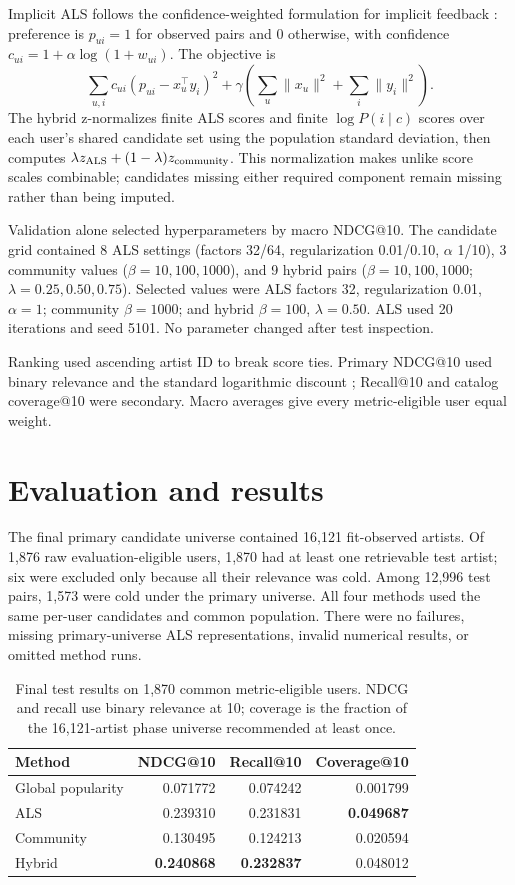 \documentclass[10pt,a4paper]{article}
\begin{document}
Implicit ALS follows the confidence-weighted formulation for implicit feedback \cite{hu2008}: preference is $p_{ui}=1$ for observed pairs and 0 otherwise, with confidence $c_{ui}=1+\alpha\log(1+w_{ui})$. The objective is
\[
 \sum_{u,i}c_{ui}(p_{ui}-x_u^\top y_i)^2+\gamma\left(\sum_u\lVert x_u\rVert^2+\sum_i\lVert y_i\rVert^2\right).
\]
The hybrid z-normalizes finite ALS scores and finite $\log P(i\mid c)$ scores over each user's shared candidate set using the population standard deviation, then computes $\lambda z_{\rm ALS}+(1-\lambda)z_{\rm community}$. This normalization makes unlike score scales combinable; candidates missing either required component remain missing rather than being imputed.

Validation alone selected hyperparameters by macro NDCG@10. The candidate grid contained 8 ALS settings (factors 32/64, regularization 0.01/0.10, $\alpha$ 1/10), 3 community values ($\beta=10,100,1000$), and 9 hybrid pairs ($\beta=10,100,1000$; $\lambda=0.25,0.50,0.75$). Selected values were ALS factors 32, regularization 0.01, $\alpha=1$; community $\beta=1000$; and hybrid $\beta=100$, $\lambda=0.50$. ALS used 20 iterations and seed 5101. No parameter changed after test inspection.

Ranking used ascending artist ID to break score ties. Primary NDCG@10 used binary relevance and the standard logarithmic discount \cite{jarvelin2002}; Recall@10 and catalog coverage@10 were secondary. Macro averages give every metric-eligible user equal weight.

\section{Evaluation and results}

The final primary candidate universe contained 16,121 fit-observed artists. Of 1,876 raw evaluation-eligible users, 1,870 had at least one retrievable test artist; six were excluded only because all their relevance was cold. Among 12,996 test pairs, 1,573 were cold under the primary universe. All four methods used the same per-user candidates and common population. There were no failures, missing primary-universe ALS representations, invalid numerical results, or omitted method runs.

\begin{table}[h]
\centering
\caption{Final test results on 1,870 common metric-eligible users. NDCG and recall use binary relevance at 10; coverage is the fraction of the 16,121-artist phase universe recommended at least once.}
\begin{tabular}{lrrr}
\toprule
Method & NDCG@10 & Recall@10 & Coverage@10 \\
\midrule
Global popularity & 0.071772 & 0.074242 & 0.001799 \\
ALS & 0.239310 & 0.231831 & \textbf{0.049687} \\
Community & 0.130495 & 0.124213 & 0.020594 \\
Hybrid & \textbf{0.240868} & \textbf{0.232837} & 0.048012 \\
\bottomrule
\end{tabular}
\label{tab:main}
\end{table}
\end{document}
